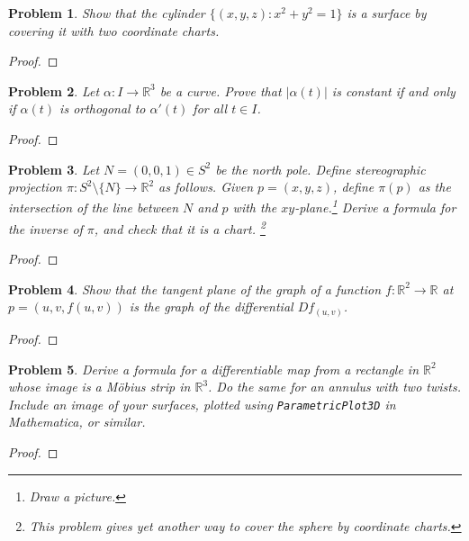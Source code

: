 \documentclass[11pt]{article}
\newtheorem{problem}{Problem}
\begin{document}
\begin{problem}
Show that the cylinder $\{(x,y,z):x^2+y^2=1\}$ is a surface by covering it with two coordinate charts. 
\end{problem}

\begin{proof}

\end{proof}


\pagebreak

\begin{problem}
Let $\alpha:I\to\mathbb R^3$ be a curve. Prove that $|\alpha(t)|$ is constant if and only if $\alpha(t)$ is orthogonal to $\alpha'(t)$ for all $t\in I$. 
\end{problem}

\begin{proof}

\end{proof} 

\pagebreak

\begin{problem}
Let $N=(0,0,1)\in S^2$ be the north pole. Define stereographic projection $\pi: S^2\setminus\{N\}\to \mathbb R^2$ as follows. Given $p=(x,y,z)$, define $\pi(p)$ as the intersection of the line between $N$ and $p$ with the $xy$-plane.\footnote{Draw a picture.} Derive a formula for the inverse of $\pi$, and check that it is a chart.  \footnote{This problem gives yet another way to cover the sphere by coordinate charts.} 
\end{problem}

\begin{proof}

\end{proof}

\pagebreak

\begin{problem}
Show that the tangent plane of the graph of a function $f:\mathbb R^2\to\mathbb R$ at $p=(u,v,f(u,v))$ is the graph of the differential $Df_{(u,v)}$. 
\end{problem}

\begin{proof}

\end{proof}

\pagebreak

\begin{problem}
Derive a formula for a differentiable map from a rectangle in $\mathbb R^2$ whose image is a M\"obius strip in $\mathbb R^3$. Do the same for an annulus with two twists. Include an image of your surfaces, plotted using \texttt{ParametricPlot3D} in Mathematica, or similar. 
\end{problem}


\begin{proof}

\end{proof}
\end{document}
